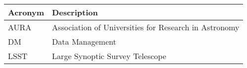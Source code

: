\addtocounter{table}{-1}
\begin{longtable}{p{}p{}}\hline
\textbf{Acronym} & \textbf{Description}  \\\hline

AURA & Association of Universities for Research in Astronomy \\\hline
DM & Data Management \\\hline
LSST & Large Synoptic Survey Telescope \\\hline
\end{longtable}
